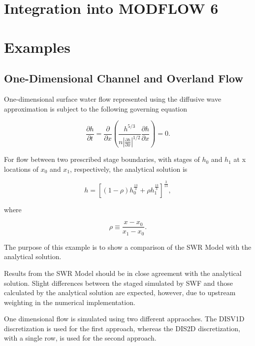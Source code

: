 \documentclass[fleqn]{article}
\begin{document}
\section{Integration into MODFLOW 6}

\section{Examples}

\subsection{One-Dimensional Channel and Overland Flow}
One-dimensional surface water flow represented using the diffusive wave approximation is subject to the following governing equation

\begin{equation}
  \frac{\partial h}{\partial t} = \frac{\partial}{\partial x} 
  \left ( \frac{h^{5/3}}{n \left | \frac{\partial h}{\partial x} \right |^{1/2}} 
  \frac{\partial h}{\partial x} \right ) = 0 .
\end{equation}

\noindent For flow between two prescribed stage boundaries, with stages of $h_0$ and $h_1$ at x locations of $x_0$ and $x_1$, respectively, the analytical solution is

\begin{equation}
  h = \left [ \left (1 - \rho \right ) h^{\frac{13}{3}}_{0} + \rho h^{\frac{13}{3}}_{1} \right ]^{\frac{3}{13}} ,
  \label{eqn:soln_ss}
\end{equation}

\noindent where

\begin{equation}
  \rho \equiv \frac{x - x_0}{x_1 - x_0} .
  \label{eqn:rho_defined_x}
\end{equation}

The purpose of this example is to show a comparison of the SWR Model with the analytical solution. 

Results from the SWR Model should be in close agreement with the analytical solution.  Slight differences between the staged simulated by SWF and those calculated by the analytical solution are expected, however, due to upstream weighting in the numerical implementation.

One dimensional flow is simulated using two different appraoches.  The DISV1D discretization is used for the first approach, whereas the DIS2D discretization, with a single row, is used for the second approach.
\end{document}
